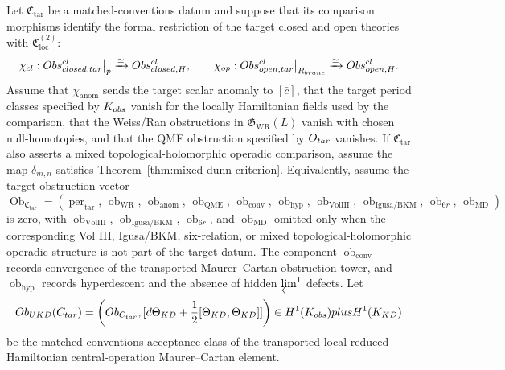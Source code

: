 \begin{thm}\label{thm:matched-conventions-transfer}
  Let \(\mathfrak C_{\mathrm{tar}}\) be a matched-conventions datum and
  suppose that its comparison morphisms identify the formal restriction of
  the target closed and open theories with
  \(\mathfrak C_{\mathrm{loc}}^{(2)}\):
  \[
    \chi_{cl}:
    Obs^{cl}_{closed,tar}\big|_{p}
      \xrightarrow{\simeq}
    Obs^{cl}_{closed,H},
    \qquad
    \chi_{op}:
    Obs^{cl}_{open,tar}\big|_{R_{brane}}
      \xrightarrow{\simeq}
    Obs^{cl}_{open,H}.
  \]
  Assume that \(\chi_{\mathrm{anom}}\) sends the target scalar anomaly to
  \([\bar c]\), that the target period classes specified by
  \(K_{obs}\) vanish for the locally Hamiltonian fields used
  by the comparison, that the Weiss/Ran obstructions in
  \(\mathfrak G_{\mathrm{WR}}(L)\) vanish with chosen null-homotopies, and
  that the QME obstruction specified by \(O_{tar}\) vanishes.
  If \(\mathfrak C_{\mathrm{tar}}\) also asserts a mixed topological-holomorphic
  operadic comparison, assume the map \(\delta_{m,n}\) satisfies
  Theorem~\ref{thm:mixed-dunn-criterion}.
  Equivalently, assume the target obstruction vector
  \[
  \operatorname{Ob}_{\mathfrak C_{\mathrm{tar}}}
  =
  \left(
    \operatorname{per}_{\mathrm{tar}},\,
    \operatorname{ob}_{\mathrm{WR}},\,
    \operatorname{ob}_{\mathrm{anom}},\,
    \operatorname{ob}_{\mathrm{QME}},\,
    \operatorname{ob}_{\mathrm{conv}},\,
    \operatorname{ob}_{\mathrm{hyp}},\,
    \operatorname{ob}_{\mathrm{VolIII}},\,
    \operatorname{ob}_{\mathrm{Igusa/BKM}},\,
    \operatorname{ob}_{6r},\,
    \operatorname{ob}_{\mathrm{MD}}
  \right)
  \]
  is zero, with \(\operatorname{ob}_{\mathrm{VolIII}}\),
  \(\operatorname{ob}_{\mathrm{Igusa/BKM}}\), \(\operatorname{ob}_{6r}\),
  and \(\operatorname{ob}_{\mathrm{MD}}\) omitted only when the
  corresponding Vol III, Igusa/BKM, six-relation, or mixed
  topological-holomorphic operadic structure is not part of the target
  datum.  The component \(\operatorname{ob}_{\mathrm{conv}}\)
  records convergence of the transported Maurer--Cartan obstruction
  tower, and \(\operatorname{ob}_{\mathrm{hyp}}\) records hyperdescent
  and the absence of hidden \(\varprojlim^1\) defects.
  Let
  \[
    Ob_{UKD}(C_{tar})
      =
    \left(
      Ob_{C_{tar}},
      [d\Theta_{KD}+\frac12[\Theta_{KD},\Theta_{KD}]]
    \right)
    \in
    H^1(K_{obs})
      plus H^1(K_{KD})
  \]
  be the matched-conventions acceptance class of the transported local reduced
  Hamiltonian central-operation Maurer--Cartan element.


\end{thm}
